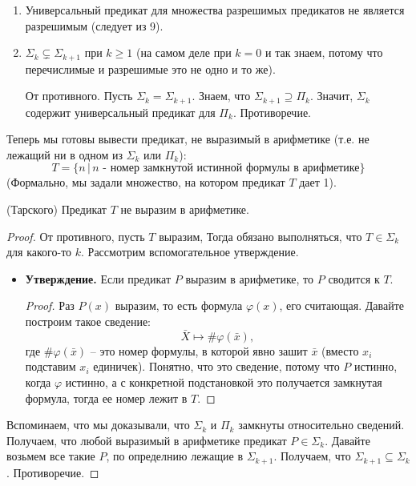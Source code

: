 \begin{enumerate}
    \item Универсальный предикат для множества разрешимых предикатов не является разрешимым (следует из 9).
    \item $\Sigma_k \subsetneq \Sigma_{k+1}$ при $k \geqslant 1$ (на самом деле при $k = 0$ и так знаем, потому что перечислимые и разрешимые это не одно и то же).
    
    От противного. Пусть $\Sigma_k = \Sigma_{k+1}$. Знаем, что $\Sigma_{k+1} \supseteq \Pi_k$. Значит, $\Sigma_k$ содержит универсальный предикат для $\Pi_k$. Противоречие.
\end{enumerate}

Теперь мы готовы вывести предикат, не выразимый в арифметике (т.е. не лежащий ни в одном из $\Sigma_k$ или $\Pi_k$): \[ T = \{ n \,|\, \text{$n$ - номер замкнутой истинной формулы в арифметике} \} \] 
(Формально, мы задали множество, на котором предикат $T$ дает 1).

\vspace*{5mm}

\begin{theorem} (Тарского)
    Предикат $T$ не выразим в арифметике.
\end{theorem}
\begin{proof}
    От противного, пусть $T$ выразим, Тогда обязано выполняться, что $T \in \Sigma_k$ для какого-то $k$. Рассмотрим вспомогательное утверждение.

    \begin{itemize}
        \item[] \textbf{Утверждение.} Если предикат $P$ выразим в арифметике, то $P$ сводится к $T$. 
        \begin{proof}
            Раз $P(x)$ выразим, то есть формула $\varphi(x)$, его считающая. Давайте 
            построим такое сведение: \[ \bar{X} \mapsto \#\varphi(\bar{x}), \] 
            где $\#\varphi(\bar{x})$ -- это номер формулы, в которой явно зашит $\bar{x}$ (вместо $x_i$ подставим $x_i$ единичек). Понятно, что это сведение, потому что $P$ истинно, когда $\varphi$ истинно, а с конкретной подстановкой это получается замкнутая формула, тогда ее номер лежит в $T$. 
        \end{proof}
    \end{itemize}

    Вспоминаем, что мы доказывали, что $\Sigma_k$ и $\Pi_k$ замкнуты относительно сведений. Получаем, что любой выразимый в арифметике предикат $P \in \Sigma_k$. Давайте возьмем все такие $P$, по определнию лежащие в $\Sigma_{k+1}$. Получаем, что $\Sigma_{k+1} \subseteq \Sigma_k$. Противоречие.
\end{proof}

